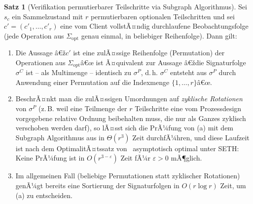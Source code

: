 ﻿\documentclass[a4paper,12pt]{article}
\theoremstyle{definition}
\newtheorem{satz}{Satz}
\begin{document}
\begin{satz}[Verifikation permutierbarer Teilschritte via Subgraph Algorithmus]
	\label{satz:permutierbar-subgraph}
	Sei $s_c$ ein Sammelzustand mit $r$ permutierbaren optionalen Teilschritten und sei
	$c'=(c'_1,\ldots,c'_r)$ eine vom Client vollstÃ¤ndig durchlaufene Beobachtungsfolge
	(jede Operation aus $\Sigma_{\mathrm{opt}}$ genau einmal, in beliebiger Reihenfolge).
	Dann gilt:
	\begin{enumerate}
		\item[(a)] Die Aussage â€ž$c'$ ist eine zulÃ¤ssige Reihenfolge (Permutation) der
		      Operationen aus $\Sigma_{\mathrm{opt}}$â€œ ist Ã¤quivalent zur Aussage â€ždie
		      Signaturfolge $\sigma^{C}$ ist -- als Multimenge -- identisch zu
		      $\sigma^{P}$, d.\,h. $\sigma^{C}$ entsteht aus $\sigma^{P}$ durch
		      Anwendung einer Permutation auf die Indexmenge $\{1,\ldots,r\}$â€œ.
		\item[(b)] BeschrÃ¤nkt man die zulÃ¤ssigen Umordnungen auf \emph{zyklische
		      Rotationen} von $\sigma^{P}$ (z.\,B. weil eine Teilmenge der $r$
		      Teilschritte eine vom Prozessdesign vorgegebene relative Ordnung
		      beibehalten muss, die nur als Ganzes zyklisch verschoben werden darf), so
		      lÃ¤sst sich die PrÃ¼fung von (a) mit dem Subgraph Algorithmus aus
		      \cite{epp2026subgraph} in $\Theta(r^3)$ Zeit durchfÃ¼hren, und diese
		      Laufzeit ist nach dem OptimalitÃ¤tssatz von~\cite{epp2026subgraph}
		      asymptotisch optimal unter SETH: Keine PrÃ¼fung ist in
		      $O(r^{3-\varepsilon})$ Zeit fÃ¼r $\varepsilon>0$ mÃ¶glich.
		\item[(c)] Im allgemeinen Fall (beliebige Permutationen statt zyklischer
		      Rotationen) genÃ¼gt bereits eine Sortierung der Signaturfolgen in
		      $O(r \log r)$ Zeit, um (a) zu entscheiden.
	\end{enumerate}
\end{satz}
\end{document}
